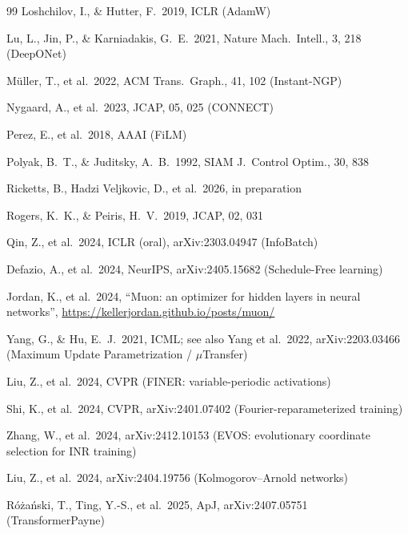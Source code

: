 \documentclass[11pt,a4paper]{article}
\begin{document}
\begin{thebibliography}{99}
Loshchilov, I., \& Hutter, F.\ 2019, ICLR (AdamW)

Lu, L., Jin, P., \& Karniadakis, G.~E.\ 2021, Nature Mach.~Intell., 3,
218 (DeepONet)

M{\"u}ller, T., et al.\ 2022, ACM Trans.~Graph., 41, 102 (Instant-NGP)

Nygaard, A., et al.\ 2023, JCAP, 05, 025 (CONNECT)

Perez, E., et al.\ 2018, AAAI (FiLM)

Polyak, B.~T., \& Juditsky, A.~B.\ 1992, SIAM J.~Control Optim., 30,
838

Ricketts, B., Hadzi Veljkovic, D., et al.\ 2026, in preparation

Rogers, K.~K., \& Peiris, H.~V.\ 2019, JCAP, 02, 031

Qin, Z., et al.\ 2024, ICLR (oral), arXiv:2303.04947 (InfoBatch)

Defazio, A., et al.\ 2024, NeurIPS, arXiv:2405.15682
(Schedule-Free learning)

Jordan, K., et al.\ 2024, ``Muon: an optimizer for hidden layers in
neural networks'', \url{https://kellerjordan.github.io/posts/muon/}

Yang, G., \& Hu, E.~J.\ 2021, ICML; see also Yang et al.\ 2022,
arXiv:2203.03466 (Maximum Update Parametrization / $\mu$Transfer)

Liu, Z., et al.\ 2024, CVPR (FINER: variable-periodic activations)

Shi, K., et al.\ 2024, CVPR, arXiv:2401.07402
(Fourier-reparameterized training)

Zhang, W., et al.\ 2024, arXiv:2412.10153 (EVOS: evolutionary
coordinate selection for INR training)

Liu, Z., et al.\ 2024, arXiv:2404.19756 (Kolmogorov--Arnold networks)

R{\'o}{\.z}a{\'n}ski, T., Ting, Y.-S., et al.\ 2025, ApJ,
arXiv:2407.05751 (TransformerPayne)


\end{thebibliography}
\end{document}
